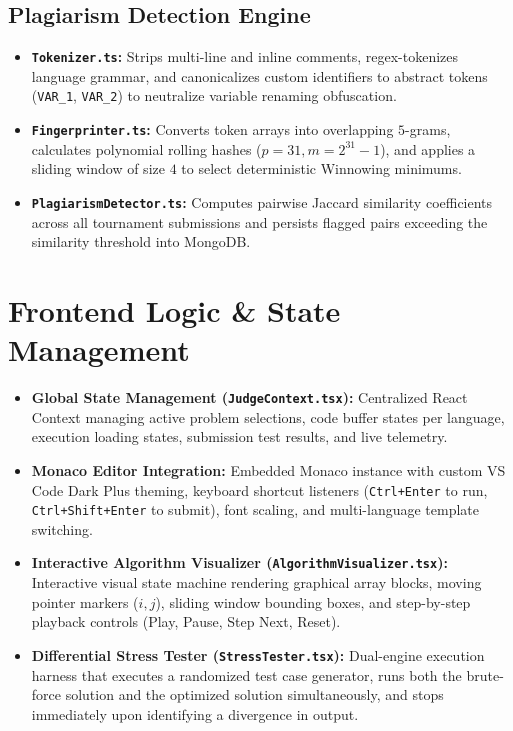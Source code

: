 \documentclass[12pt,a4paper]{report}
\begin{document}
\subsection{Plagiarism Detection Engine}
\begin{itemize}[leftmargin=*]
  \item \textbf{\texttt{Tokenizer.ts}:} Strips multi-line and inline comments, regex-tokenizes language grammar, and canonicalizes custom identifiers to abstract tokens (\texttt{VAR\_1}, \texttt{VAR\_2}) to neutralize variable renaming obfuscation.
  \item \textbf{\texttt{Fingerprinter.ts}:} Converts token arrays into overlapping $5$-grams, calculates polynomial rolling hashes ($p=31, m=2^{31}-1$), and applies a sliding window of size $4$ to select deterministic Winnowing minimums.
  \item \textbf{\texttt{PlagiarismDetector.ts}:} Computes pairwise Jaccard similarity coefficients across all tournament submissions and persists flagged pairs exceeding the similarity threshold into MongoDB.
\end{itemize}

\section{Frontend Logic \& State Management}
\begin{itemize}[leftmargin=*]
  \item \textbf{Global State Management (\texttt{JudgeContext.tsx}):} Centralized React Context managing active problem selections, code buffer states per language, execution loading states, submission test results, and live telemetry.
  \item \textbf{Monaco Editor Integration:} Embedded Monaco instance with custom VS Code Dark Plus theming, keyboard shortcut listeners (\texttt{Ctrl+Enter} to run, \texttt{Ctrl+Shift+Enter} to submit), font scaling, and multi-language template switching.
  \item \textbf{Interactive Algorithm Visualizer (\texttt{AlgorithmVisualizer.tsx}):} Interactive visual state machine rendering graphical array blocks, moving pointer markers ($i, j$), sliding window bounding boxes, and step-by-step playback controls (Play, Pause, Step Next, Reset).
  \item \textbf{Differential Stress Tester (\texttt{StressTester.tsx}):} Dual-engine execution harness that executes a randomized test case generator, runs both the brute-force solution and the optimized solution simultaneously, and stops immediately upon identifying a divergence in output.
\end{itemize}
\end{document}
